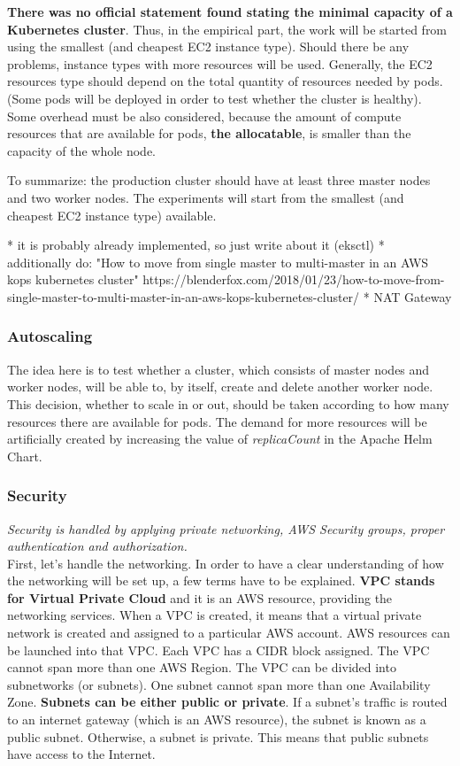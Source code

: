 \textbf{There was no official statement found stating the minimal capacity of a Kubernetes cluster}. Thus, in the empirical part, the work will be started from using the smallest (and cheapest EC2 instance type). Should there be any problems, instance types with more resources will be used. Generally, the EC2 resources type should depend on the total quantity of resources needed by pods. (Some pods will be deployed in order to test whether the cluster is healthy). Some overhead must be also considered, because the amount of compute resources that are available for pods, \textbf{the allocatable}, is smaller than the capacity of the whole node\cite{k8s-alloc}.

To summarize: the production cluster should have at least three master nodes and two worker nodes. The experiments will start from the smallest (and cheapest EC2 instance type) available.

* it is probably already implemented, so just write about it (eksctl)
* additionally do: "How to move from single master to multi-master in an AWS kops kubernetes cluster" https://blenderfox.com/2018/01/23/how-to-move-from-single-master-to-multi-master-in-an-aws-kops-kubernetes-cluster/
* NAT Gateway

\subsubsection{Autoscaling}

The idea here is to test whether a cluster, which consists of master nodes and worker nodes, will be able to, by itself, create and delete another worker node. This decision, whether to scale in or out, should be taken according to how many resources there are available for pods. The demand for more resources will be artificially created by increasing the value of \textit{replicaCount} in the Apache Helm Chart\cite{helm-apache}.


\subsubsection{Security}
\textit{Security is handled by applying private networking, AWS Security groups, proper authentication and authorization.}
\\

First, let's handle the networking. In order to have a clear understanding of how the networking will be set up, a few terms have to be explained. \textbf{VPC stands for Virtual Private Cloud} and it is an AWS resource, providing the networking services. When a VPC is created, it means that a virtual private network is created and assigned to a particular AWS account. AWS resources can be launched into that VPC. Each VPC has a CIDR block assigned. The VPC cannot span more than one AWS Region. The VPC can be divided into subnetworks (or subnets). One subnet cannot span more than one Availability Zone. \textbf{Subnets can be either public or private}. If a subnet's traffic is routed to an internet gateway (which is an AWS resource), the subnet is known as a public subnet. Otherwise, a subnet is private\cite{aws-vpc}. This means that public subnets have access to the Internet.

